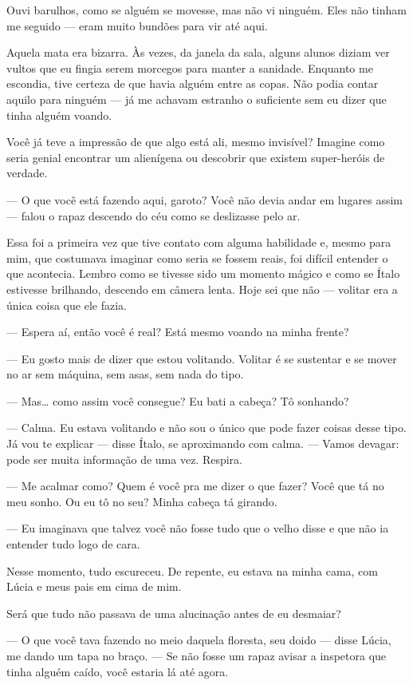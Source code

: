 Ouvi barulhos, como se alguém se movesse, mas não vi ninguém. Eles não tinham me seguido — eram muito bundões para vir até aqui.

Aquela mata era bizarra. Às vezes, da janela da sala, alguns alunos diziam ver vultos que eu fingia serem morcegos para manter a sanidade. Enquanto me escondia, tive certeza de que havia alguém entre as copas. Não podia contar aquilo para ninguém — já me achavam estranho o suficiente sem eu dizer que tinha alguém voando.

Você já teve a impressão de que algo está ali, mesmo invisível? Imagine como seria genial encontrar um alienígena ou descobrir que existem super-heróis de verdade.

— O que você está fazendo aqui, garoto? Você não devia andar em lugares assim — falou o rapaz descendo do céu como se deslizasse pelo ar.

Essa foi a primeira vez que tive contato com alguma habilidade e, mesmo para mim, que costumava imaginar como seria se fossem reais, foi difícil entender o que acontecia. Lembro como se tivesse sido um momento mágico e como se Ítalo estivesse brilhando, descendo em câmera lenta. Hoje sei que não — volitar era a única coisa que ele fazia.

— Espera aí, então você é real? Está mesmo voando na minha frente?

— Eu gosto mais de dizer que estou volitando. Volitar é se sustentar e se mover no ar sem máquina, sem asas, sem nada do tipo.

— Mas… como assim você consegue? Eu bati a cabeça? Tô sonhando?

— Calma. Eu estava volitando e não sou o único que pode fazer coisas desse tipo. Já vou te explicar — disse Ítalo, se aproximando com calma. — Vamos devagar: pode ser muita informação de uma vez. Respira.

— Me acalmar como? Quem é você pra me dizer o que fazer? Você que tá no meu sonho. Ou eu tô no seu? Minha cabeça tá girando.

— Eu imaginava que talvez você não fosse tudo que o velho disse e que não ia entender tudo logo de cara.

Nesse momento, tudo escureceu. De repente, eu estava na minha cama, com Lúcia e meus pais em cima de mim.

Será que tudo não passava de uma alucinação antes de eu desmaiar?

— O que você tava fazendo no meio daquela floresta, seu doido — disse Lúcia, me dando um tapa no braço. — Se não fosse um rapaz avisar a inspetora que tinha alguém caído, você estaria lá até agora.

